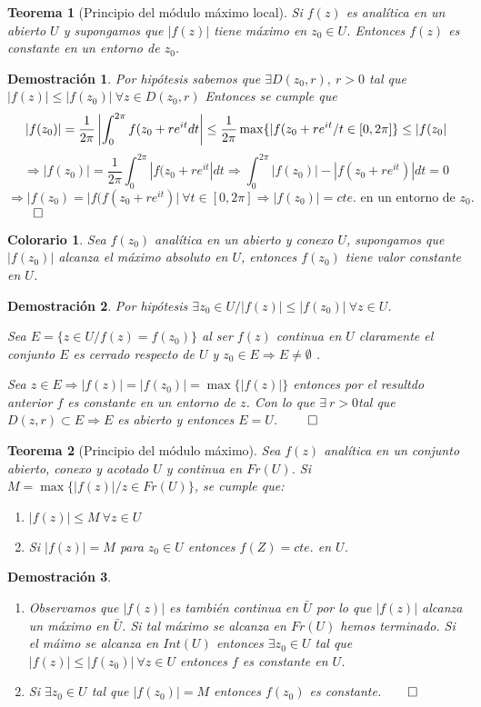 \documentclass[10pt]{book}
\newtheorem{theorem}{Teorema}[chapter]
\newtheorem*{dem}{Demostración}
\newtheorem{col}{Colorario}[chapter]
\begin{document}
\begin{theorem}[Principio del módulo máximo local]
Si $f(z)$ es analítica en un abierto $U$ y supongamos que $|f(z)|$ tiene máximo en $z_0\in U$. Entonces $f(z)$ es constante en un entorno de $z_0$.
\end{theorem}

\begin{dem}
Por hipótesis sabemos que $\exists D(z_0,r),\ r>0$ tal que $|f(z)| \leq |f(z_0)|\ \forall z \in D(z_0,r)$ Entonces se cumple que
$$
|f(z_0)| = \frac{1}{2\pi}\left| \int_0^{2\pi}f(z_0+re^{it}dt\right| \leq \frac{1}{2\pi}\max\{|f(z_0+re^{it}/t\in [0,2\pi]\}\leq |f(z_0|
$$
$$
\Rightarrow |f(z_0)| = \frac{1}{2\pi}\int_0^{2\pi}|f(z_0+re^{it}|dt \Rightarrow \int_0^{2\pi} |f(z_0)|-|f(z_0+re^{it})|dt = 0
$$
$$
\Rightarrow |f(z_0) = |f(f(z_0+re^{it})|\ \forall t\in[0,2\pi]\Rightarrow |f(z_0)|= cte. \text{ en un entorno de } z_0.
$$$\qed$
\end{dem}

\begin{col}
Sea $f(z_0)$ analítica en un abierto y conexo $U$, supongamos que $|f(z_0)|$ alcanza el máximo absoluto en $U$, entonces $f(z_0)$ tiene valor constante en $U$.
\end{col}
\begin{dem}
Por hipótesis $\exists z_0 \in U / |f(z)|\leq |f(z_0)| \ \forall z \in U$.

Sea $E = \{z\in U / f(z) = f(z_0)\}$ al ser $f(z)$ continua en $U$ claramente el conjunto $E$ es cerrado respecto de $U$  y $z_0\in E \Rightarrow E \neq \emptyset$ .

Sea $z\in E \Rightarrow |f(z)| = |f(z_0)| = \max\{|f(z)|\}$ entonces por el resultdo anterior $f$ es constante en un entorno de $z$. Con lo que $\exists\  r>0 $tal que $D(z,r)\subset E \Rightarrow E$ es abierto y entonces $E=U$. $\qed$
\end{dem}

\begin{theorem}[Principio del módulo máximo]
Sea $f(z)$ analítica en un conjunto abierto, conexo y acotado $U$ y continua en $Fr(U)$. Si $M =\max \{|f(z)|/ z\in Fr(U)\}$, se cumple que:
\begin{enumerate}
\item $|f(z)|\leq M \ \forall z \in U$
\item Si $|f(z)| = M$ para $z_0 \in U$ entonces $f(Z) = cte.$ en $U$.
\end{enumerate}
\end{theorem}

\begin{dem}
\begin{enumerate}
\item Observamos que $|f(z)|$ es también continua en $\bar{U}$ por lo que $|f(z)|$ alcanza un máximo en $\bar{U}$. Si tal máximo se alcanza en $Fr(U)$ hemos terminado.
Si el máimo se alcanza en  $Int(U)$ entonces $\exists z_0 \in U$ tal que $|f(z)|\leq |f(z_0)| \ \forall z\in U$ entonces $f$ es constante en $U$.
\item Si $\exists z_0 \in U$ tal que $|f(z_0)| = M$ entonces $f(z_0)$ es constante.$\qed$
\end{enumerate}
\end{dem}
\end{document}
